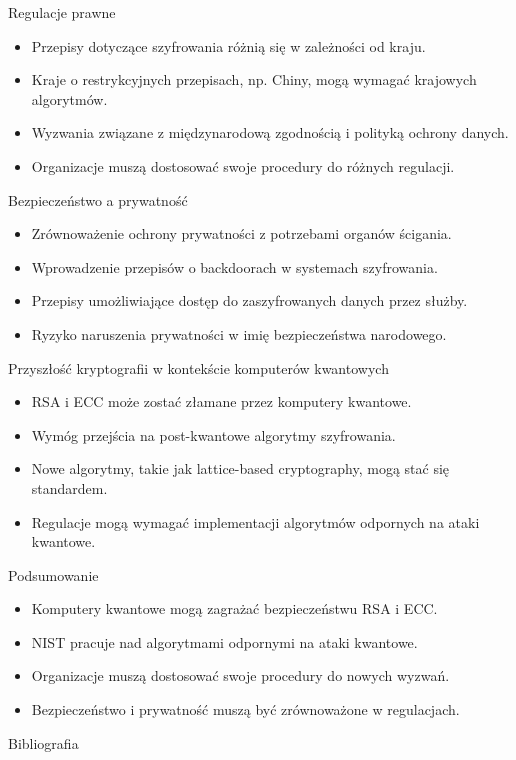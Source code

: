 \begin{frame}{Regulacje prawne}
    \begin{itemize}
            \item Przepisy dotyczące szyfrowania różnią się w zależności od kraju.
            \item Kraje o restrykcyjnych przepisach, np. Chiny, mogą wymagać krajowych algorytmów.
            \item Wyzwania związane z międzynarodową zgodnością i polityką ochrony danych.
            \item Organizacje muszą dostosować swoje procedury do różnych regulacji.
    \end{itemize}
\end{frame}
\begin{frame}{Bezpieczeństwo a prywatność}
    \begin{itemize}
        \item Zrównoważenie ochrony prywatności z potrzebami organów ścigania.
        \item Wprowadzenie przepisów o backdoorach w systemach szyfrowania.
        \item Przepisy umożliwiające dostęp do zaszyfrowanych danych przez służby.
        \item Ryzyko naruszenia prywatności w imię bezpieczeństwa narodowego.
    \end{itemize}
\end{frame}
\begin{frame}{Przyszłość kryptografii w kontekście komputerów kwantowych}  
    \begin{itemize}
    \item RSA i ECC może zostać złamane przez komputery kwantowe.
    \item Wymóg przejścia na post-kwantowe algorytmy szyfrowania.
    \item Nowe algorytmy, takie jak lattice-based cryptography, mogą stać się standardem.
    \item Regulacje mogą wymagać implementacji algorytmów odpornych na ataki kwantowe.
    \end{itemize}
\end{frame}
\begin{frame}{Podsumowanie}
    \begin{itemize}
        \item Komputery kwantowe mogą zagrażać bezpieczeństwu RSA i ECC.
        \item NIST pracuje nad algorytmami odpornymi na ataki kwantowe.
        \item Organizacje muszą dostosować swoje procedury do nowych wyzwań.
        \item Bezpieczeństwo i prywatność muszą być zrównoważone w regulacjach.
    \end{itemize}
\end{frame}
    

\begin{frame}{Bibliografia}
\printbibliography
\end{frame}
